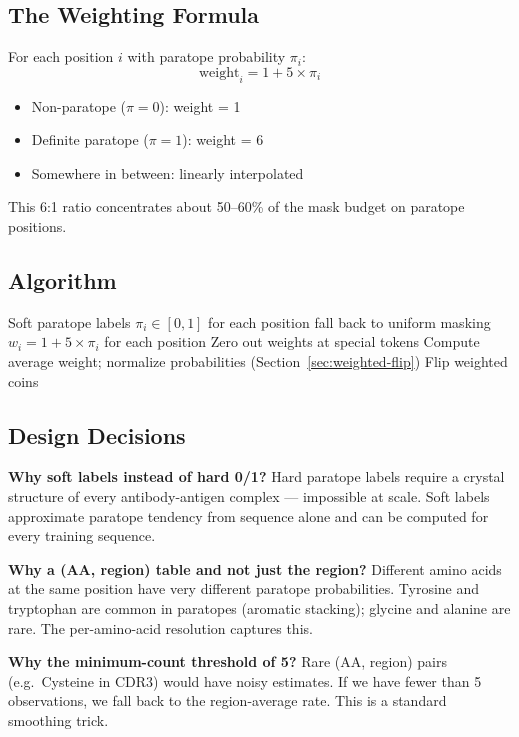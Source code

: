 \documentclass[11pt]{article}
\begin{document}
\subsection{The Weighting Formula}
For each position $i$ with paratope probability $\pi_i$:
\[
\text{weight}_i = 1 + 5 \times \pi_i
\]
\begin{itemize}
\item Non-paratope ($\pi = 0$): weight = 1
\item Definite paratope ($\pi = 1$): weight = 6
\item Somewhere in between: linearly interpolated
\end{itemize}

This 6:1 ratio concentrates about 50--60\% of the mask budget
on paratope positions.

\subsection{Algorithm}
\begin{algorithm}[H]
\caption{Interface Masking}
\begin{algorithmic}[1]
\Require Soft paratope labels $\pi_i \in [0,1]$ for each position
    \State fall back to uniform masking
\EndIf
\State $w_i = 1 + 5 \times \pi_i$ for each position
\State Zero out weights at special tokens
\State Compute average weight; normalize probabilities (Section~\ref{sec:weighted-flip})
\State Flip weighted coins
\end{algorithmic}
\end{algorithm}

\subsection{Design Decisions}

\textbf{Why soft labels instead of hard 0/1?}
Hard paratope labels require a crystal structure of every
antibody-antigen complex --- impossible at scale. Soft labels
approximate paratope tendency from sequence alone and can be
computed for every training sequence.

\textbf{Why a (AA, region) table and not just the region?}
Different amino acids at the same position have very different
paratope probabilities. Tyrosine and tryptophan are common in
paratopes (aromatic stacking); glycine and alanine are rare.
The per-amino-acid resolution captures this.

\textbf{Why the minimum-count threshold of 5?}
Rare (AA, region) pairs (e.g.\ Cysteine in CDR3) would have
noisy estimates. If we have fewer than 5 observations, we fall
back to the region-average rate. This is a standard smoothing
trick.
\end{document}
